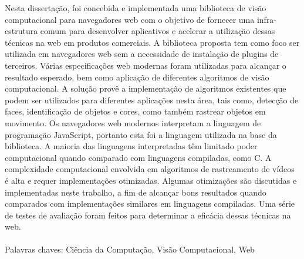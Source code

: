 Nesta dissertação, foi concebida e implementada uma biblioteca de visão computacional para navegadores web com o objetivo de fornecer uma infra-estrutura comum para desenvolver aplicativos e acelerar a utilização dessas técnicas na web em produtos comerciais. A biblioteca proposta tem como foco ser utilizada em navegadores web sem a necessidade de instalação de plugins de terceiros. Várias especificações web modernas foram utilizadas para alcançar o resultado esperado, bem como aplicação de diferentes algoritmos de visão computacional. A solução provê a implementação de algoritmos existentes que podem ser utilizados para diferentes aplicações nesta área, tais como, detecção de faces, identificação de objetos e cores, como também rastrear objetos em movimento. Os navegadores web modernos interpretam a linguagem de programação JavaScript, portanto esta foi a linguagem utilizada na base da biblioteca. A maioria das linguagens interpretadas têm limitado poder computacional quando comparado com linguagens compiladas, como C. A complexidade computacional envolvida em algoritmos de rastreamento de vídeos é alta e requer implementações otimizadas. Algumas otimizações são discutidas e implementadas neste trabalho, a fim de alcançar bons resultados quando comparados com implementações similares em linguagens compiladas. Uma série de testes de avaliação foram feitos para determinar a eficácia dessas técnicas na web.
\\\\
Palavras chaves: Ciência da Computação, Visão Computacional, Web